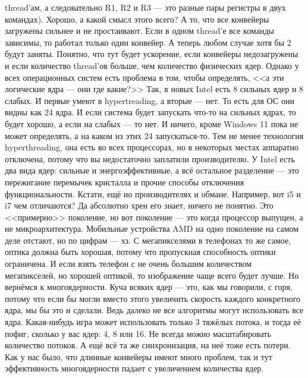 \documentclass{article}
\begin{document}
thread'ам, а следовательно R1, R2 и R3 --- это разные пары регистры в двух командах). Хорошо, а какой смысл этого всего? А то, что все конвейеры загружены сильнее и не простаивают. Если в одном thread'е все команды зависимы, то работал только один конвейер. А теперь любом случае хотя бы 2 будут заняты. Понятно, что тут будет ускорение, если конвейеры недозагружены и если количество thread'ов больше, чем количество физических ядер. Однако у всех операционных систем есть проблема в том, чтобы определять, <<а эти логические ядра --- они где какие?>> Так, в новых Intel есть 8 сильных ядер и 8 слабых. И первые умеют в hypertreading, а вторые --- нет. То есть для ОС они видны как 24 ядра. И если система будет запускать что-то на сильных ядрах, то будет хорошо, а если на слабых --- то нет. И ничего, кроме Windows 11 пока не может определять, а на каком из этих 24 запускаться-то. Тем не менее технология hyperthreading, она есть во всех процессорах, но в некоторых местах аппаратно отключена, потому что вы недостаточно заплатили производителю. У Intel есть два вида ядер: сильные и энергоэффективные, а всё остальное разделение --- это пережигание перемычек кристалла и прочие способы отключения функциональности. Кстати, ещё ио производителях и обмане. Например, вот i5 и i7 чем отличаются? Да абсолютно хрен его знает, ничего не понятно. Это <<примерно>> поколение, но вот поколение --- это когда процессор выпущен, а не микроархитектура. Мобильные устройства AMD на одно поколение на самом деле отстают, но по цифрам --- хз. С мегапикселями в телефонах то же самое, оптика должна быть хорошая, потому что пропускная способность оптики ограничена. И если взять телефон с не очень большим количеством мегапикселей, но хорошей оптикой, то изображение чаще всего будет лучше. Но вернёмся к многоядерности. Куча всяких ядер --- это, как мы говорили, с горя, потому что если бы могли вместо этого увеличить скорость каждого конкретного ядра, мы бы это и сделали. Ведь далеко не все алгоритмы могут использовать все ядра. Какая-нибудь игра может использовать только 3 тяжёлых потока, и тогда её пофиг, сколько у вас ядер: 4, 8 или 16. Не всегда можно масштабировать количество потоков. А ещё всё та же синхронизация, на неё тоже есть потери. Как у нас было, что длинные конвейеры имеют много проблем, так и тут эффективность многоядерности падает с увеличением количества ядер.
\end{document}
